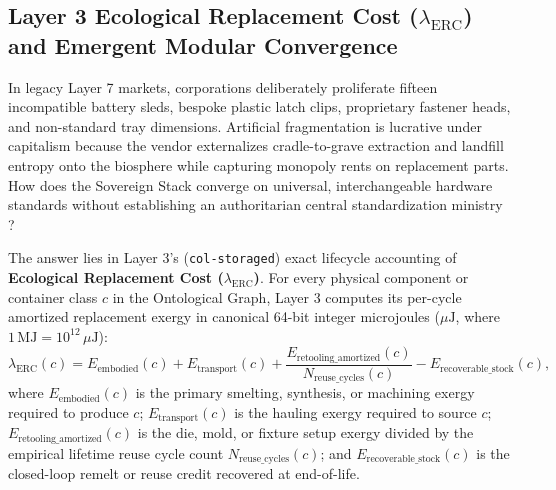 \subsection{Layer 3 Ecological Replacement Cost ($\lambda_{\mathrm{ERC}}$) and Emergent Modular Convergence}
\label{subsec:lambda-erc-modular-convergence}

In legacy Layer 7 markets, corporations deliberately proliferate fifteen incompatible battery sleds, bespoke plastic latch clips, proprietary fastener heads, and non-standard tray dimensions. Artificial fragmentation is lucrative under capitalism because the vendor externalizes cradle-to-grave extraction and landfill entropy onto the biosphere while capturing monopoly rents on replacement parts. How does the Sovereign Stack converge on universal, interchangeable hardware standards without establishing an authoritarian central standardization ministry \parencite{scott1998}?

The answer lies in Layer 3's (\texttt{col-storaged}) exact lifecycle accounting of \textbf{Ecological Replacement Cost ($\lambda_{\mathrm{ERC}}$)}. For every physical component or container class $c$ in the Ontological Graph, Layer 3 computes its per-cycle amortized replacement exergy in canonical 64-bit integer microjoules ($\mu\mathrm{J}$, where $1\,\mathrm{MJ} = 10^{12}\,\mu\mathrm{J}$):
\begin{equation}
\label{eq:lambda-erc-definition}
\lambda_{\mathrm{ERC}}(c) = E_{\mathrm{embodied}}(c) + E_{\mathrm{transport}}(c) + \frac{E_{\mathrm{retooling\_amortized}}(c)}{N_{\mathrm{reuse\_cycles}}(c)} - E_{\mathrm{recoverable\_stock}}(c),
\end{equation}
where $E_{\mathrm{embodied}}(c)$ is the primary smelting, synthesis, or machining exergy required to produce $c$; $E_{\mathrm{transport}}(c)$ is the hauling exergy required to source $c$; $E_{\mathrm{retooling\_amortized}}(c)$ is the die, mold, or fixture setup exergy divided by the empirical lifetime reuse cycle count $N_{\mathrm{reuse\_cycles}}(c)$; and $E_{\mathrm{recoverable\_stock}}(c)$ is the closed-loop remelt or reuse credit recovered at end-of-life.

